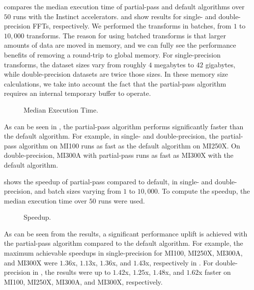 \documentclass{gtac}
\newcommand{\defaultheight}{3.8cm}
\newcommand{\defaultwidth}{9cm}
\newlength\figureheight
\newlength\figurewidth
\theoremstyle{problemstyle}
\begin{document}
 compares the median execution time of partial-pass and default algorithms over $50$ runs with the Instinct accelerators.  and  show results for single- and double-precision FFTs, respectively. We performed the transforms in batches, from $1$ to $10,000$ transforms. The reason for using batched transforms is that larger amounts of data are moved in memory, and we can fully see the performance benefits of removing a round-trip to global memory. For single-precision transforms, the dataset sizes vary from roughly $4$ megabytes to $42$ gigabytes, while double-precision datasets are twice those sizes. In these memory size calculations, we take into account the fact that the partial-pass algorithm requires an internal temporary buffer to operate.
\begin{figure}[h]  
  \setlength\figureheight{\defaultheight} 
  \setlength\figurewidth{\defaultwidth}
  \centering  
  
  \captionsetup[sub]{singlelinecheck=off}
  \subfloat[$\mkern-90mu$]{\label{subfig:single_precision_time} }
  \subfloat[$\mkern-90mu$]{\label{subfig:double_precision_time} }
  \caption{Median Execution Time.}
  \label{fig:execution_time}
  \end{figure}
As can be seen in , the partial-pass algorithm performs significantly faster than the default algorithm. For example, in single- and double-precision, the partial-pass algorithm on MI100 runs as fast as the default algorithm on MI250X. On double-precision, MI300A with partial-pass runs as fast as MI300X with the default algorithm. 

 shows the speedup of partial-pass compared to default, in single- and double-precision, and batch sizes varying from $1$ to $10,000$. To compute the speedup, the median execution time over $50$ runs were used. 
\begin{figure}[h]  
    \setlength\figureheight{\defaultheight} 
    \setlength\figurewidth{\defaultwidth}
    \centering  
    
    \captionsetup[sub]{singlelinecheck=off}
    \subfloat[$\mkern-90mu$]{\label{subfig:single_precision_speedup} }
    \subfloat[$\mkern-90mu$]{\label{subfig:double_precision_speedup} }
    \caption{Speedup.}
    \label{fig:speed_up}
  \end{figure}
As can be seen from the results, a significant performance uplift is achieved with the partial-pass algorithm compared to the default algorithm. For example, the maximum achievable speedups in single-precision for MI100, MI250X, MI300A, and MI300X were $1.36$x, $1.13$x, $1.36$x, and $1.43$x, respectively in . For double-precision in , the results were up to $1.42$x, $1.25$x, $1.48$x, and $1.62$x faster on MI100, MI250X, MI300A, and MI300X, respectively.
\end{document}
